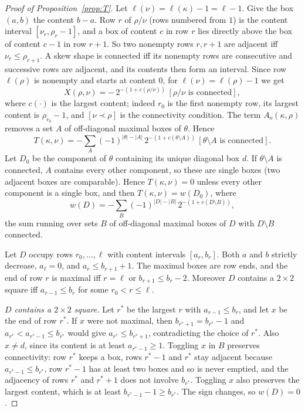 \documentclass[11pt]{amsart}
\theoremstyle{definition}
\theoremstyle{remark}
\begin{document}
\begin{proof}[Proof of Proposition~\ref{prop:T}]
Let $\ell(\nu)=\ell(\kappa)-1=\ell-1$. Give the box $(a,b)$ the content $b-a$. Row $r$ of
$\rho/\nu$ (rows numbered from $1$) is the content interval $[\nu_r,\rho_r-1]$, and a box of
content $c$ in row $r$ lies directly above the box of content $c-1$ in row $r+1$. So two
nonempty rows $r,r+1$ are adjacent iff $\nu_r\le\rho_{r+1}$. A skew shape is connected iff its
nonempty rows are consecutive and successive rows are adjacent, and its contents then form an
interval. Since row $\ell(\rho)$ is nonempty and starts at content $0$, for
$\ell(\nu)=\ell(\rho)-1$ we get
\[ X(\rho,\nu)=-\,2^{-(1+c(\rho/\nu))}\,[\rho/\nu\text{ is connected}], \]
where $c(\cdot)$ is the largest content; indeed $r_0$ is the first nonempty row, its largest
content is $\rho_{r_0}-1$, and $[\nu\prec\rho]$ is the connectivity condition. The term
$A_o(\kappa,\rho)$ removes a set $A$ of off-diagonal maximal boxes of $\theta$. Hence
\[ T(\kappa,\nu)=-\sum_A(-1)^{|\theta|-|A|}\,2^{-(1+c(\theta\setminus A))}\,[\theta\setminus A\text{ is connected}]. \]
Let $D_0$ be the component of $\theta$ containing its unique diagonal box $d$. If
$\theta\setminus A$ is connected, $A$ contains every other component, so these are single boxes
(two adjacent boxes are comparable). Hence $T(\kappa,\nu)=0$ unless every other component is a
single box, and then $T(\kappa,\nu)=w(D_0)$, where
\[ w(D)=-\sum_{B}(-1)^{|D|-|B|}\,2^{-(1+c(D\setminus B))}, \]
the sum running over sets $B$ of off-diagonal maximal boxes of $D$ with $D\setminus B$ connected.

Let $D$ occupy rows $r_0,\dots,\ell$ with content intervals $[a_r,b_r]$. Both $a$ and $b$ strictly
decrease, $a_\ell=0$, and $a_r\le b_{r+1}+1$. The maximal boxes are row ends, and the end of
row $r$ is maximal iff $r=\ell$ or $b_{r+1}\le b_r-2$. Moreover $D$ contains a $2\times2$ square
iff $a_{r-1}\le b_r$ for some $r_0<r\le\ell$.

\emph{$D$ contains a $2\times2$ square.} Let $r^*$ be the largest $r$ with $a_{r-1}\le b_r$, and
let $x$ be the end of row $r^*$. If $x$ were not maximal, then $b_{r^*+1}=b_{r^*}-1$ and
$a_{r^*}<a_{r^*-1}\le b_{r^*}$ would give $a_{r^*}\le b_{r^*+1}$, contradicting the choice of
$r^*$. Also $x\ne d$, since its content is at least $a_{r^*-1}\ge1$. Toggling $x$ in $B$
preserves connectivity: row $r^*$ keeps a box, rows $r^*-1$ and $r^*$ stay adjacent because
$a_{r^*-1}\le b_{r^*}$, row $r^*-1$ has at least two boxes and so is never emptied, and the
adjacency of rows $r^*$ and $r^*+1$ does not involve $b_{r^*}$. Toggling $x$ also preserves the
largest content, which is at least $b_{r^*-1}-1\ge b_{r^*}$. The sign changes, so $w(D)=0$.


\end{proof}
\end{document}

